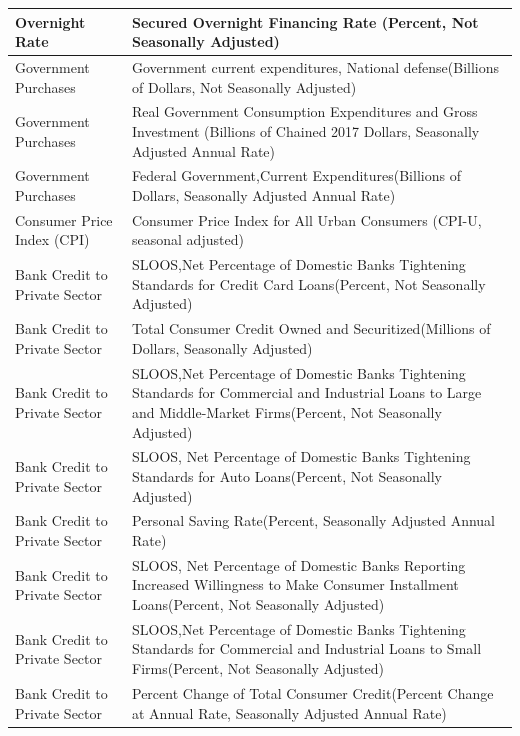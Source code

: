 \begin{center}
\begin{singlespace}
\begin{scriptsize}
\begin{longtable}{p{}|p{}}
        \hline
        Overnight Rate  & Secured Overnight Financing Rate (Percent, Not Seasonally Adjusted) \\
        \hline
        Government Purchases  & Government current expenditures, National defense(Billions of Dollars, Not Seasonally Adjusted) \\
        \hline
        Government Purchases  & Real Government Consumption Expenditures and Gross Investment (Billions of Chained 2017 Dollars, Seasonally Adjusted Annual Rate) \\
        \hline
        Government Purchases  & Federal Government,Current Expenditures(Billions of Dollars, Seasonally Adjusted Annual Rate) \\
        \hline
        Consumer Price Index (CPI)  & Consumer Price Index for All Urban Consumers (CPI-U, seasonal adjusted) \\
        \hline
        Bank Credit to Private Sector  & SLOOS,Net Percentage of Domestic Banks Tightening Standards for Credit Card Loans(Percent, Not Seasonally Adjusted) \\
        \hline
        Bank Credit to Private Sector  & Total Consumer Credit Owned and Securitized(Millions of Dollars, Seasonally Adjusted) \\
        \hline
        Bank Credit to Private Sector  & SLOOS,Net Percentage of Domestic Banks Tightening Standards for Commercial and Industrial Loans to Large and Middle-Market Firms(Percent, Not Seasonally Adjusted) \\
        \hline
        Bank Credit to Private Sector  & SLOOS, Net Percentage of Domestic Banks Tightening Standards for Auto Loans(Percent, Not Seasonally Adjusted) \\
        \hline
        Bank Credit to Private Sector  & Personal Saving Rate(Percent, Seasonally Adjusted Annual Rate) \\
        \hline
        Bank Credit to Private Sector  & SLOOS, Net Percentage of Domestic Banks Reporting Increased Willingness to Make Consumer Installment Loans(Percent, Not Seasonally Adjusted) \\
        \hline
        Bank Credit to Private Sector  & SLOOS,Net Percentage of Domestic Banks Tightening Standards for Commercial and Industrial Loans to Small Firms(Percent, Not Seasonally Adjusted) \\
        \hline
        Bank Credit to Private Sector  & Percent Change of Total Consumer Credit(Percent Change at Annual Rate, Seasonally Adjusted Annual Rate) \\

\end{longtable}
\end{scriptsize}
\end{singlespace}
\end{center}
